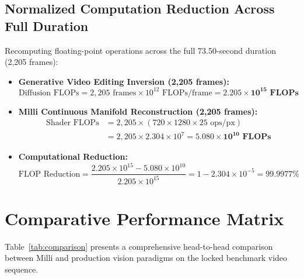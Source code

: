 \documentclass[11pt]{article}
\begin{document}
\subsection{Normalized Computation Reduction Across Full Duration}

Recomputing floating-point operations across the full 73.50-second duration (2,205 frames):
\begin{itemize}
    \item \textbf{Generative Video Editing Inversion (2,205 frames):}
    \begin{equation}
    \text{Diffusion FLOPs} = 2,205\text{ frames} \times 10^{12}\text{ FLOPs/frame} = \mathbf{2.205 \times 10^{15}\text{ FLOPs}}
    \end{equation}
    \item \textbf{Milli Continuous Manifold Reconstruction (2,205 frames):}
    \begin{align}
    \text{Shader FLOPs} &= 2,205 \times (720 \times 1280 \times 25\text{ ops/px}) \nonumber \\
    &= 2,205 \times 2.304 \times 10^7 = \mathbf{5.080 \times 10^{10}\text{ FLOPs}}
    \end{align}
    \item \textbf{Computational Reduction:}
    \begin{equation}
    \text{FLOP Reduction} = \frac{2.205 \times 10^{15} - 5.080 \times 10^{10}}{2.205 \times 10^{15}} = 1 - 2.304 \times 10^{-5} = \mathbf{99.9977\%}
    \end{equation}
\end{itemize}

\section{Comparative Performance Matrix}

Table~\ref{tab:comparison} presents a comprehensive head-to-head comparison between Milli and production vision paradigms on the locked benchmark video sequence.
\end{document}
